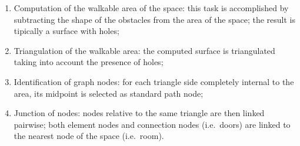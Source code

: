 \begin{enumerate}
\def\labelenumi{\arabic{enumi}.}
\itemsep1pt\parskip0pt
\item
 Computation of the walkable area of the space: this task is
 accomplished by subtracting the shape of the obstacles from the area
 of the space; the result is tipically a surface with holes;
\item
 Triangulation of the walkable area: the computed surface is
 triangulated taking into account the presence of holes;
\item
 Identification of graph nodes: for each triangle side completely
 internal to the area, its midpoint is selected as standard path node;
\item
 Junction of nodes: nodes relative to the same triangle are then linked
 pairwise; both element nodes and connection nodes (i.e.~doors) are
 linked to the nearest node of the space (i.e.~room).
\end{enumerate}

